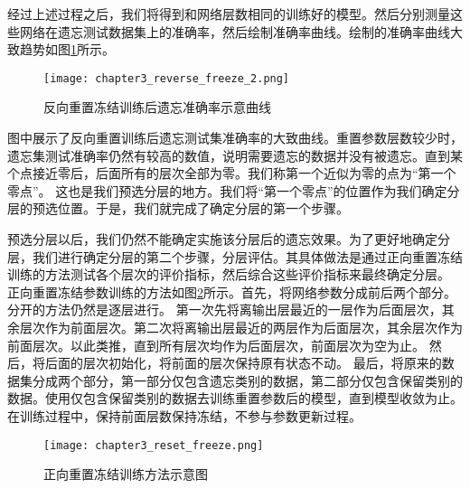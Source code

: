 经过上述过程之后，我们将得到和网络层数相同的训练好的模型。然后分别测量这些网络在遗忘测试数据集上的准确率，然后绘制准确率曲线。绘制的准确率曲线大致趋势如图\ref{fig:chapter3_reverse_freeze_2}所示。
\begin{figure}
    \centering
    \texttt{[image: chapter3\_reverse\_freeze\_2.png]}
    \caption{反向重置冻结训练后遗忘准确率示意曲线}
    \label{fig:chapter3_reverse_freeze_2}
\end{figure}
图中展示了反向重置训练后遗忘测试集准确率的大致曲线。重置参数层数较少时，遗忘集测试准确率仍然有较高的数值，说明需要遗忘的数据并没有被遗忘。直到某个点接近零后，后面所有的层次全部为零。我们称第一个近似为零的点为“第一个零点”。
这也是我们预选分层的地方。我们将“第一个零点”的位置作为我们确定分层的预选位置。于是，我们就完成了确定分层的第一个步骤。

预选分层以后，我们仍然不能确定实施该分层后的遗忘效果。为了更好地确定分层，我们进行确定分层的第二个步骤，分层评估。其具体做法是通过正向重置冻结训练的方法测试各个层次的评价指标，然后综合这些评价指标来最终确定分层。
正向重置冻结参数训练的方法如图\ref{fig:chapter3_reset_freeze}所示。首先，将网络参数分成前后两个部分。分开的方法仍然是逐层进行。
第一次先将离输出层最近的一层作为后面层次，其余层次作为前面层次。第二次将离输出层最近的两层作为后面层次，其余层次作为前面层次。以此类推，直到所有层次均作为后面层次，前面层次为空为止。
然后，将后面的层次初始化，将前面的层次保持原有状态不动。
最后，将原来的数据集分成两个部分，第一部分仅包含遗忘类别的数据，第二部分仅包含保留类别的数据。使用仅包含保留类别的数据去训练重置参数后的模型，直到模型收敛为止。在训练过程中，保持前面层数保持冻结，不参与参数更新过程。
\begin{figure}
    \centering
    \texttt{[image: chapter3\_reset\_freeze.png]}
    \caption{正向重置冻结训练方法示意图}
    \label{fig:chapter3_reset_freeze}
\end{figure}

